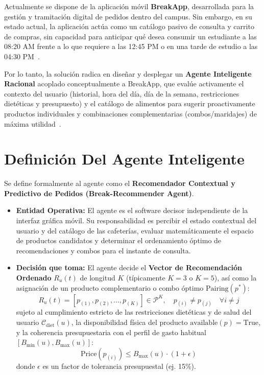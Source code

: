 \documentclass{article}
\begin{document}
Actualmente se dispone de la aplicación móvil \textbf{BreakApp}, desarrollada para la gestión y tramitación digital de pedidos dentro del campus. Sin embargo, en su estado actual, la aplicación actúa como un catálogo pasivo de consulta y carrito de compras, sin capacidad para anticipar qué desea consumir un estudiante a las 08:20 AM frente a lo que requiere a las 12:45 PM o en una tarde de estudio a las 04:30 PM~\cite{burke2002hybrid}. 

Por lo tanto, la solución radica en diseñar y desplegar un \textbf{Agente Inteligente Racional} acoplado conceptualmente a BreakApp, que evalúe activamente el contexto del usuario (historial, hora del día, día de la semana, restricciones dietéticas y presupuesto) y el catálogo de alimentos para sugerir proactivamente productos individuales y combinaciones complementarias (combos/maridajes) de máxima utilidad~\cite{russell2020artificial}.

\section{Definición Del Agente Inteligente}

Se define formalmente al agente como el \textbf{Recomendador Contextual y Predictivo de Pedidos (Break-Recommender Agent)}.

\begin{itemize}
    \item \textbf{Entidad Operativa:} El agente es el software decisor independiente de la interfaz gráfica móvil. Su responsabilidad es percibir el estado contextual del usuario y del catálogo de las cafeterías, evaluar matemáticamente el espacio de productos candidatos y determinar el ordenamiento óptimo de recomendaciones y combos para el instante de consulta.
    \item \textbf{Decisión que toma:} El agente decide el \textbf{Vector de Recomendación Ordenado} $R_u(t)$ de longitud $K$ (típicamente $K=3$ o $K=5$), así como la asignación de un producto complementario o combo óptimo $\mathrm{Pairing}(p^*)$:
    \[
        R_u(t) = \left[ p_{(1)}, p_{(2)}, \dots, p_{(K)} \right] \in \mathcal{P}^K, \quad p_{(i)} \neq p_{(j)} \quad \forall i \neq j
    \]
    sujeto al cumplimiento estricto de las restricciones dietéticas y de salud del usuario $\mathcal{C}_{\mathrm{diet}}(u)$, la disponibilidad física del producto $\mathrm{available}(p) = \mathrm{True}$, y la coherencia presupuestaria con el perfil de gasto habitual $[B_{\min}(u), B_{\max}(u)]$:
    \[
        \mathrm{Price}(p_{(i)}) \leq B_{\max}(u) \cdot (1 + \epsilon)
    \]
    donde $\epsilon$ es un factor de tolerancia presupuestal (ej. 15\%).
\end{itemize}
\end{document}

